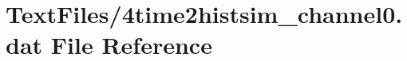 \hypertarget{4time2histsim__channel0_8dat}{}\section{Text\+Files/4time2histsim\+\_\+channel0.dat File Reference}
\label{4time2histsim__channel0_8dat}

